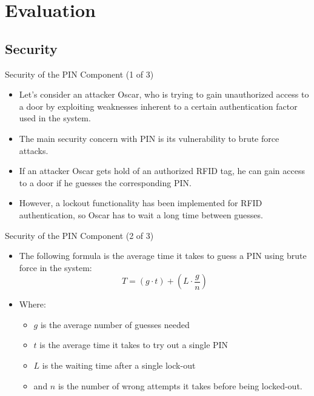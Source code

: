 \section{Evaluation}
\subsection{Security}
\begin{frame}{Security of the PIN Component (1 of 3)}
\begin{itemize}
	\item<1-> Let's consider an attacker Oscar, who is trying to gain unauthorized access to a door by exploiting weaknesses inherent to a certain authentication factor used in the system.
    \item<2-> The main security concern with PIN is its vulnerability to brute force attacks.
    \item<3-> If an attacker Oscar gets hold of an authorized RFID tag, he can gain access to a door if he guesses the corresponding PIN.
    \item<4-> However, a lockout functionality has been implemented for RFID authentication, so Oscar has to wait a long time between guesses.
\end{itemize}
\end{frame}

\begin{frame}{Security of the PIN Component (2 of 3)}
\begin{itemize}
	\item<1-> The following formula is the average time it takes to guess a PIN using brute force in the system:
	$$T = (g \cdot t) + (L \cdot \frac gn) $$
	\item<2-> Where:
	\begin{itemize}
		\item<3-> $g$ is the average number of guesses needed
		\item<4-> $t$ is the average time it takes to try out a single PIN
		\item<5-> $L$ is the waiting time after a single lock-out
		\item<6-> and $n$ is the number of wrong attempts it takes before being locked-out.
	\end{itemize}
\end{itemize}
\end{frame}

